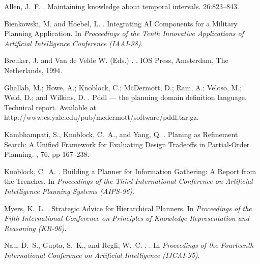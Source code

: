 \begin{thebibliography}{}
Allen, J.~F.
.
\newblock Maintaining knowledge about temporal intervals.
 26:823--843.

Bienkowski, M. and Hoebel, L.
. 
\newblock Integrating AI Components for a Military Planning Application.   
\newblock In {\em Proceedings of the Tenth Innovative Applications of 
Artificial Intelligence Conference (IAAI-98)}.

Breuker, J. and Van de Velde W. (Eds.)
.
. 
IOS Press, Amsterdam, The Netherlands, 1994.

Ghallab, M.; Howe, A.; Knoblock, C.; McDermott, D.; Ram, A.; Veloso, M.; Weld,
  D.; and Wilkins, D.
.
\newblock Pddl --- the planning domain definition language.
\newblock Technical report.
\newblock Available at
  http://www.cs.yale.edu/pub/mcdermott/software/pddl.tar.gz.

Kambhampati, S., Knoblock, C.~A., and Yang, Q.
.
\newblock Planing as Refinement Search: A Unified Framework for 
Evaluating Design Tradeoffs in Partial-Order Planning. 
, 76, pp 167--238.

Knoblock, C.~A.
.
\newblock Building a Planner for Information Gathering: 
A Report from the Trenches. 
\newblock In {\em Proceedings of the Third International Conference
on Artificial Intelligence Planning Systems (AIPS-96)}.

Myers, K.~L.
.
\newblock Strategic Advice for Hierarchical Planners. 
\newblock In {\em Proceedings of the Fifth International 
Conference on Principles of Knowledge Representation and Reasoning (KR-96)}.

Nau, D.~S., Gupta, S.~K., and Regli, W.~C.
. 
.   
\newblock In {\em Proceedings of the Fourteenth International 
Conference on Artificial Intelligence (IJCAI-95)}.


\end{thebibliography}
